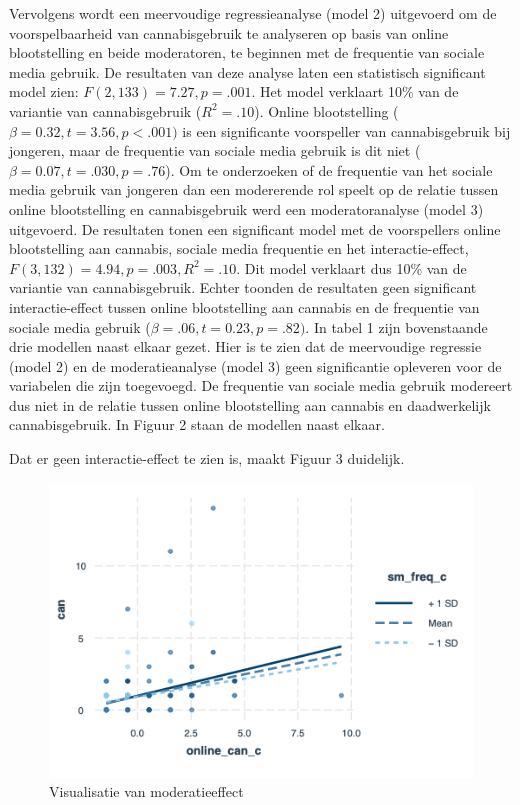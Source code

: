 \documentclass[
  letterpaper,
  DIV=11,
  numbers=noendperiod]{scrartcl}
\begin{document}
Vervolgens wordt een meervoudige regressieanalyse (model 2) uitgevoerd
om de voorspelbaarheid van cannabisgebruik te analyseren op basis van
online blootstelling en beide moderatoren, te beginnen met de frequentie
van sociale media gebruik. De resultaten van deze analyse laten een
statistisch significant model zien: \(F(2,133) = 7.27, p = .001\). Het
model verklaart 10\% van de variantie van cannabisgebruik
(\(R^2 = .10\)). Online blootstelling
(\(\beta = 0.32, t = 3.56, p <.001)\) is een significante voorspeller
van cannabisgebruik bij jongeren, maar de frequentie van sociale media
gebruik is dit niet (\(\beta = 0.07, t = .030, p = .76\)). Om te
onderzoeken of de frequentie van het sociale media gebruik van jongeren
dan een modererende rol speelt op de relatie tussen online blootstelling
en cannabisgebruik werd een moderatoranalyse (model 3) uitgevoerd. De
resultaten tonen een significant model met de voorspellers online
blootstelling aan cannabis, sociale media frequentie en het
interactie-effect, \(F(3, 132) = 4.94, p = .003, R^2 = .10\). Dit model
verklaart dus 10\% van de variantie van cannabisgebruik. Echter toonden
de resultaten geen significant interactie-effect tussen online
blootstelling aan cannabis en de frequentie van sociale media gebruik
(\(\beta = .06, t = 0.23, p = .82)\). In tabel 1 zijn bovenstaande drie
modellen naast elkaar gezet. Hier is te zien dat de meervoudige
regressie (model 2) en de moderatieanalyse (model 3) geen significantie
opleveren voor de variabelen die zijn toegevoegd. De frequentie van
sociale media gebruik modereert dus niet in de relatie tussen online
blootstelling aan cannabis en daadwerkelijk cannabisgebruik. In Figuur 2
staan de modellen naast elkaar.

Dat er geen interactie-effect te zien is, maakt Figuur 3 duidelijk.

\begin{figure}

{\centering \includegraphics{images/Screenshot2.png}

}

\caption{Visualisatie van moderatieeffect}

\end{figure}
\end{document}
